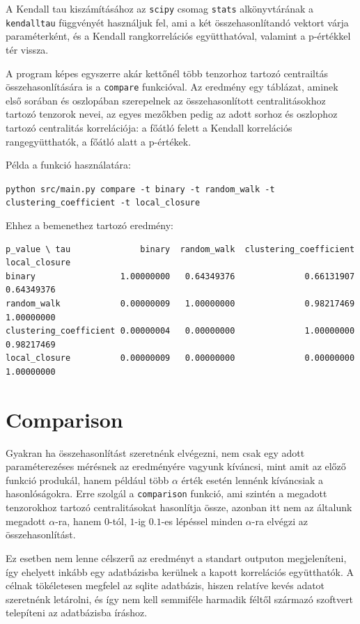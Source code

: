 \documentclass[12pt,numbers=noenddot]{report}
\begin{document}
A Kendall tau kiszámításához az \texttt{scipy} csomag \texttt{stats} 
alkönyvtárának a \texttt{kendalltau} függvényét használjuk fel, ami a két 
összehasonlítandó vektort várja paraméterként, és a Kendall rangkorrelációs 
együtthatóval, valamint a p-értékkel tér vissza.

A program képes egyszerre akár kettőnél több tenzorhoz tartozó centrailtás 
összehasonlítására is a \texttt{compare} funkcióval. Az eredmény egy táblázat, aminek első sorában és 
oszlopában szerepelnek az összehasonlított centralitásokhoz tartozó tenzorok 
nevei, az egyes mezőkben pedig az adott sorhoz és oszlophoz tartozó centralitás
korrelációja: a főátló felett a Kendall korrelációs rangegyütthatók, a főátló
alatt a p-értékek.

\noindent
Példa a funkció használatára:

\texttt{python src/main.py compare -t binary -t random\_walk -t clustering\_coefficient -t local\_closure}

\noindent
Ehhez a bemenethez tartozó eredmény:

\scriptsize
\begin{verbatim}
p_value \ tau              binary  random_walk  clustering_coefficient  local_closure
binary                 1.00000000   0.64349376              0.66131907     0.64349376
random_walk            0.00000009   1.00000000              0.98217469     1.00000000
clustering_coefficient 0.00000004   0.00000000              1.00000000     0.98217469
local_closure          0.00000009   0.00000000              0.00000000     1.00000000
\end{verbatim}
\normalsize

\section{Comparison}

Gyakran ha összehasonlítást szeretnénk elvégezni, nem csak egy adott 
paraméterezéses mérésnek az eredményére vagyunk kíváncsi, mint amit az előző
funkció produkál, hanem például több $\alpha$ érték esetén lennénk kíváncsiak
a hasonlóságokra. Erre szolgál a \texttt{comparison} funkció, ami szintén 
a megadott tenzorokhoz tartozó centralitásokat hasonlítja össze, azonban itt 
nem az általunk megadott $\alpha$-ra, hanem $0$-tól, $1$-ig $0.1$-es lépéssel
minden $\alpha$-ra elvégzi az összehasonlítást.

Ez esetben nem lenne célszerű az eredményt a standart outputon megjeleníteni,
így ehelyett inkább egy adatbázisba kerülnek a kapott korrelációs együtthatók.
A célnak tökéletesen megfelel az sqlite adatbázis, hiszen relatíve kevés 
adatot szeretnénk letárolni, és így nem kell semmiféle harmadik féltől 
származó szoftvert telepíteni az adatbázisba íráshoz.
\end{document}
